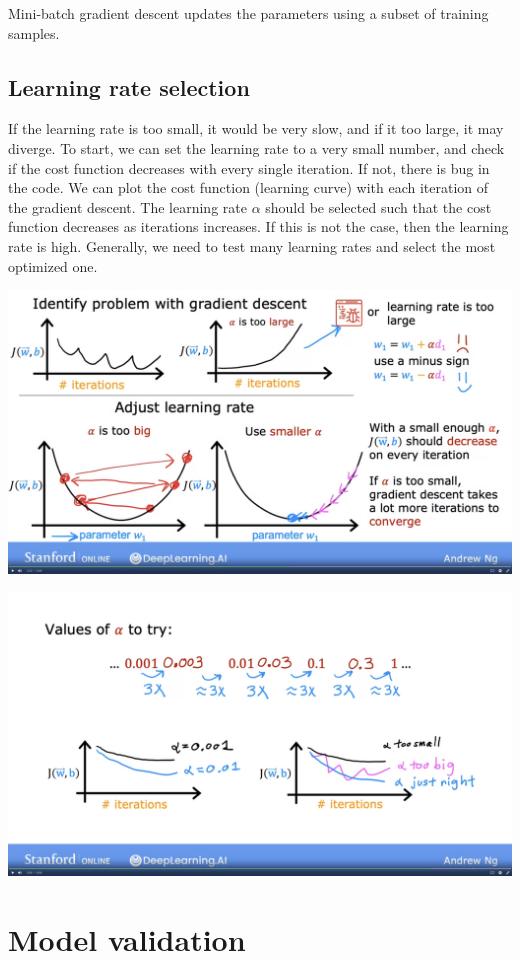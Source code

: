 \documentclass[12pt]{report}
\begin{document}
Mini-batch gradient descent updates the parameters using a subset of training samples.

\subsection{Learning rate selection}
If the learning rate is too small, it would be very slow, and if it too large, it may diverge. To start, we can set the learning rate to a very small number, and check if the cost function decreases with every single iteration. If not, there is bug in the code. We can plot the cost function (learning curve) with each iteration of the gradient descent. The learning rate $\alpha$ should be selected such that the cost function decreases as iterations increases. If this is not the case, then the learning rate is high. Generally, we need to test many learning rates and select the most optimized one.

\includegraphics[scale=0.12]{pics/LearningRate.png}

\includegraphics[scale=0.12]{pics/learningrate2.png}

\section{Model validation}
\end{document}
